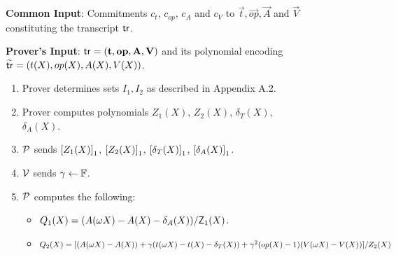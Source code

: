 \begin{figure}[htbp]

    \begin{mdframed}
    {
            {\bf Common Input}: Commitments $c_t$, $c_{op}$, $c_A$ and $c_V$ to $\vec{t},\vec{op},\vec{A}$ and $\vec{V}$ constituting the transcript $\mathsf{tr}$.

            {\bf Prover's Input}: $\mathsf{tr}=(\mathbf{t}, \mathbf{op}, \mathbf{A}, \mathbf{V})$ and its polynomial encoding $\widetilde{\mathsf{tr}}=(t(X), {op}(X), A(X), V(X))$.
        \begin{enumerate}[leftmargin=1em, label=\arabic*]
            \item Prover determines sets $I_1, I_2$ as described in Appendix A.2.
            \item Prover computes polynomials $Z_1(X)$, $Z_2(X)$, $\delta_T(X)$, $\delta_A(X)$.
            \item $\mathcal{P}$ sends $\left[{Z_1(X)}\right]_1$, $\left[{Z_2(X)}\right]_1$, $\left[{\delta_T(X)}\right]_1$, $\left[{\delta_A(X)}\right]_1$.
            \item $\mathcal{V}$ sends $\gamma\gets \mathbb{F}$.
            \item $\mathcal{P}$ computes the following:
			\begin{itemize}[label=-]
				\item $Q_1(X) =  (A(\omega X) - A(X) - \delta_A(X)) / \mathsf{Z}_1(X)$.
				\item $Q_2(X) =  [(A(\omega X) - A(X))+\gamma(t(\omega X) - t(X) - \delta_T(X))+\gamma^2 ({op}(X) - 1)(V(\omega X) - V(X))] / Z_2(X) $
			\end{itemize}


\end{enumerate}}
\end{mdframed}
\end{figure}
